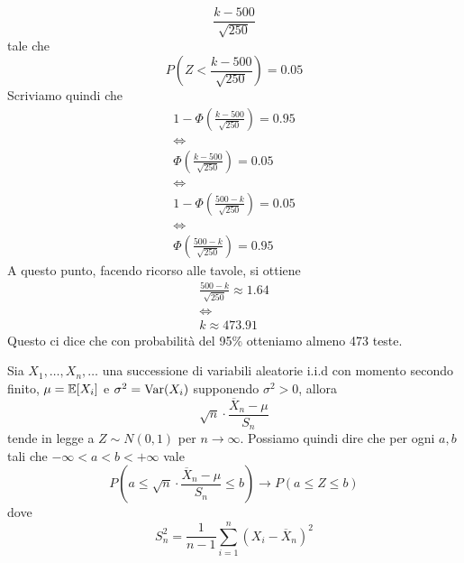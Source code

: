 \begin{example}
	\[ \frac{k - 500}{\sqrt{250}} \]
	tale che
	\[ P \left( Z < \frac{k - 500}{\sqrt{250}} \right) = 0.05 \]
	Scriviamo quindi che
	\begin{gather*}
		1 - \Phi \left( \frac{k - 500}{\sqrt{250}} \right) = 0.95 \\
		\Leftrightarrow \\
		\Phi \left( \frac{k - 500}{\sqrt{250}} \right) = 0.05 \\
		\Leftrightarrow \\
		1 - \Phi \left( \frac{500 - k}{\sqrt{250}} \right) = 0.05 \\
		\Leftrightarrow \\
		\Phi \left( \frac{500 - k}{\sqrt{250}} \right) = 0.95
	\end{gather*}
	A questo punto, facendo ricorso alle tavole, si ottiene
	\begin{gather*}
		\frac{500 - k}{\sqrt{250}} \approx 1.64 \\
		\Leftrightarrow \\
		k \approx 473.91
	\end{gather*}
	Questo ci dice che con probabilità del 95\% otteniamo almeno 473 teste.
\end{example}

\begin{proposition}
	Sia $X_1, \dots, X_n, \dots$ una successione di variabili aleatorie i.i.d con momento secondo
	finito, $\mu = \mathbb{E}[X_i]$ e $\sigma^2 = \operatorname{Var}(X_i)$ supponendo $\sigma^2 > 0$, allora
	\[ \sqrt{n} \cdot \frac{\overline{X}_n  - \mu}{S_n} \]
	tende in legge a $Z \sim N(0,1)$ per $n \to \infty$. Possiamo quindi dire che per ogni $a,b$
	tali che $-\infty < a < b < +\infty$ vale
	\[
		P \left( a \leq \sqrt{n} \cdot \frac{\overline{X}_n  - \mu}{S_n} \leq b \right) \to
		P(a \leq Z \leq b)
	\]
	dove
	\[ S_n^2 = \frac{1}{n-1} \sum_{i=1}^{n} (X_i - \overline{X}_n)^2 \]
\end{proposition}
